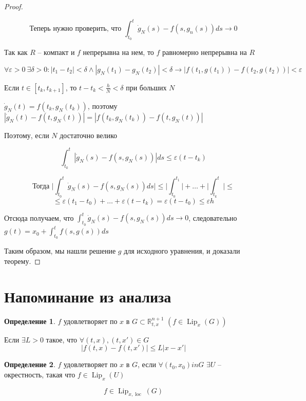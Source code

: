 \documentclass[a4paper]{article}
\theoremstyle{indented}
\theoremstyle{definition}
\newtheorem*{defn}{Определение}
\theoremstyle{remark}
\DeclareMathOperator{\Lip}{Lip}
\DeclareMathOperator{\loc}{loc}
\begin{document}
\begin{proof}
\begin{enumerate}
    \[\text{Теперь нужно проверить, что } \int_{t_0}^{t}\dot g_N(s) - f(s,g_n(s)) ds \to 0\]

    Так как $R$ -- компакт и $f$ непрерывна на нем, то $f$ равномерно непрерывна на $R$

    \[\forall \varepsilon > 0\ \exists \delta > 0 : |t_1 - t_2| < \delta \wedge |g_N(t_1) - g_N(t_2)| < \delta \to |f(t_1,g(t_1)) - f(t_2,g(t_2))| < \varepsilon     \]

    Если $t \in [t_k, t_{k+1}]$, то $t - t_k < \frac{h}{N} < \delta$ при больших $N$

    $\dot g_N(t) = f(t_k,g_N(t_k))$, поэтому $|\dot g_N(t) - f(t,g_N(t))| = |f(t_k,g_N(t_k)) - f(t,g_N(t))|$

    Поэтому, если $N$ достаточно велико

    \[\int_{t_k}^{t}|\dot g_N(s) - f(s,g_N(s)) | ds \leqslant \varepsilon (t-t_k)\]

    \[\text{Тогда }\bigg| \int_{t_0}^{t}\dot g_N(s) - f(s,g_N(s))ds \bigg| \leqslant  \bigg|\int_{t_0}^{t_1}\bigg| + \ldots + \bigg|\int_{t_k}^{t}\bigg| \leqslant \]
    \[\leqslant \varepsilon (t_1-t_0) +\ldots + \varepsilon(t- t_k) = \varepsilon (t - t_0)  \leqslant \varepsilon h\]

    Отсюда получаем, что $\int_{t_0}^{t}\dot g_N(s) - f(s,g_N(s))ds \to 0$, следовательно $g(t) = x_0 + \int_{t_0}^{t}f(s,g(s))ds$

   
  \end{enumerate}

  Таким образом, мы нашли решение $g$ для исходного уравнения, и доказали теорему.
  
\end{proof}

\section{Напоминание из анализа}


\begin{defn}
  $f$  удовлетворяет  по $x$ в $G \subset \mathbb{R}_{t,x}^{n+1}$ $(f \in \Lip_x(G))$

  Если $\exists L > 0$ такое, что $\forall (t,x), (t,x') \in G$
  $$|f(t,x) - f(t,x')| \leqslant L|x - x'|$$

  

\end{defn}

\begin{defn}
  $f$ удовлетворяет  по $x$ в $G$, если $\forall (t_0,x_0) in G$ $\exists U$ -- окрестность, такая что $f \in \Lip_x(U)$

  \[f \in \Lip_{x, \loc}(G)\]

\end{defn}
\end{document}
